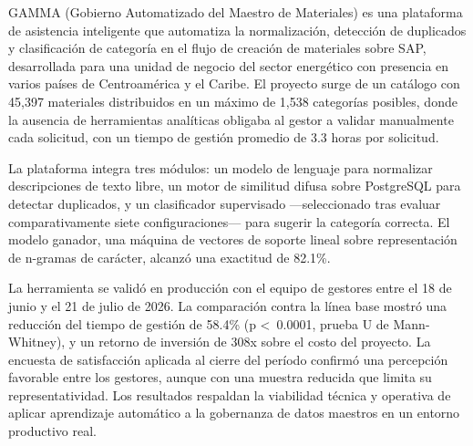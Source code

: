 GAMMA (Gobierno Automatizado del Maestro de Materiales) es una plataforma de asistencia inteligente que automatiza la normalización, detección de duplicados y clasificación de categoría en el flujo de creación de materiales sobre SAP, desarrollada para una unidad de negocio del sector energético con presencia en varios países de Centroamérica y el Caribe. El proyecto surge de un catálogo con 45,397 materiales distribuidos en un máximo de 1,538 categorías posibles, donde la ausencia de herramientas analíticas obligaba al gestor a validar manualmente cada solicitud, con un tiempo de gestión promedio de 3.3 horas por solicitud.

La plataforma integra tres módulos: un modelo de lenguaje para normalizar descripciones de texto libre, un motor de similitud difusa sobre PostgreSQL para detectar duplicados, y un clasificador supervisado —seleccionado tras evaluar comparativamente siete configuraciones— para sugerir la categoría correcta. El modelo ganador, una máquina de vectores de soporte lineal sobre representación de n-gramas de carácter, alcanzó una exactitud de 82.1\%.

La herramienta se validó en producción con el equipo de gestores entre el 18 de junio y el 21 de julio de 2026. La comparación contra la línea base mostró una reducción del tiempo de gestión de 58.4\% (p \textless\ 0.0001, prueba U de Mann-Whitney), y un retorno de inversión de 308x sobre el costo del proyecto. La encuesta de satisfacción aplicada al cierre del período confirmó una percepción favorable entre los gestores, aunque con una muestra reducida que limita su representatividad. Los resultados respaldan la viabilidad técnica y operativa de aplicar aprendizaje automático a la gobernanza de datos maestros en un entorno productivo real.